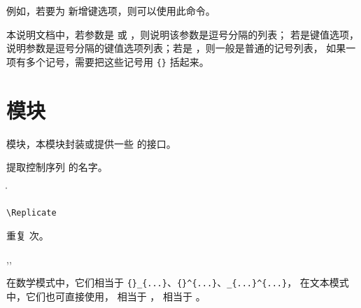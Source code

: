 \documentclass{cusdoc}
\begin{document}
例如，若要为  新增键选项，则可以使用此命令。
\begin{xample}
\begin{Framed}[frame color=blue, fill color=blue!20, color frame=2]
  \zhlipsum[1]
\end{Framed}
\stopxamplecode
\xamplecode\medskip
\end{xample}

本说明文档中，若参数是  或 ，则说明该参数是逗号分隔的列表；
若是键值选项，说明参数是逗号分隔的键值选项列表；若是 ，则一般是普通的记号列表，
如果一项有多个记号，需要把这些记号用 \verb|{}| 括起来。

\section{模块}

 模块，本模块封装或提供一些 \LaTeXe 的接口。

\begin{function}[EXP]{\csstring}
  \begin{syntax}
    \V\csstring {}
  \end{syntax}
提取控制序列  的名字。
\end{function}

\begin{xample}
\ttfamily \csstring\CusTeX \quad \csstring\|
\stopxamplecode
\xampleprint
\end{xample}

\begin{function}[EXP]{\Replicate}
\begin{syntax}
  \verb|\Replicate|  
\end{syntax}
重复   次。
\end{function}

\begin{function}{\lo,\hi,\lohi} 
  \begin{syntax}
    \V\lo   {}
    \V\hi   {}
    \V\lohi {} 
  \end{syntax}
在数学模式中，它们相当于 \verb|{}_{...}|、\verb|{}^{...}|、\verb|_{...}^{...}|，
在文本模式中，它们也可直接使用， 相当于 ，
 相当于 。
\end{function}
\end{document}
